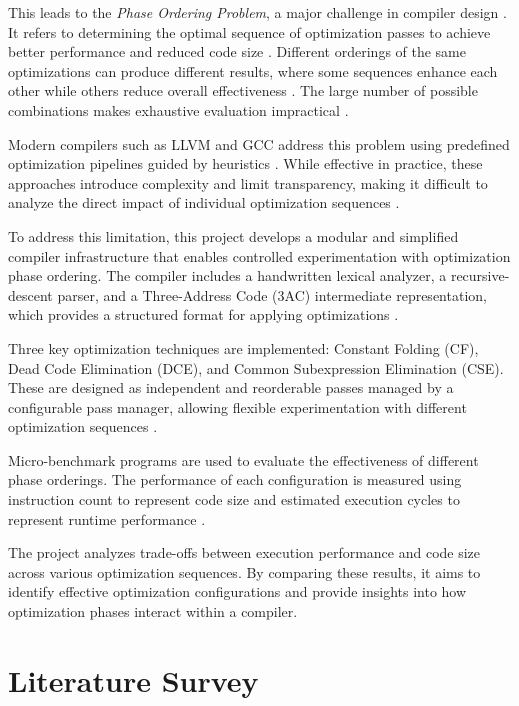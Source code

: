 \documentclass[conference]{IEEEtran}
\begin{document}
This leads to the \textit{Phase Ordering Problem}, a major challenge in compiler design \cite{ref1}. It refers to determining the optimal sequence of optimization passes to achieve better performance and reduced code size \cite{ref2}. Different orderings of the same optimizations can produce different results, where some sequences enhance each other while others reduce overall effectiveness \cite{ref19}. The large number of possible combinations makes exhaustive evaluation impractical \cite{ref2}.

Modern compilers such as LLVM and GCC address this problem using predefined optimization pipelines guided by heuristics \cite{ref16}. While effective in practice, these approaches introduce complexity and limit transparency, making it difficult to analyze the direct impact of individual optimization sequences \cite{ref16}.

To address this limitation, this project develops a modular and simplified compiler infrastructure that enables controlled experimentation with optimization phase ordering. The compiler includes a handwritten lexical analyzer, a recursive-descent parser, and a Three-Address Code (3AC) intermediate representation, which provides a structured format for applying optimizations \cite{ref18}.

Three key optimization techniques are implemented: Constant Folding (CF), Dead Code Elimination (DCE), and Common Subexpression Elimination (CSE). These are designed as independent and reorderable passes managed by a configurable pass manager, allowing flexible experimentation with different optimization sequences \cite{ref19}.

Micro-benchmark programs are used to evaluate the effectiveness of different phase orderings. The performance of each configuration is measured using instruction count to represent code size and estimated execution cycles to represent runtime performance \cite{ref10}.

The project analyzes trade-offs between execution performance and code size across various optimization sequences. By comparing these results, it aims to identify effective optimization configurations and provide insights into how optimization phases interact within a compiler.


\section{Literature Survey}
\end{document}
